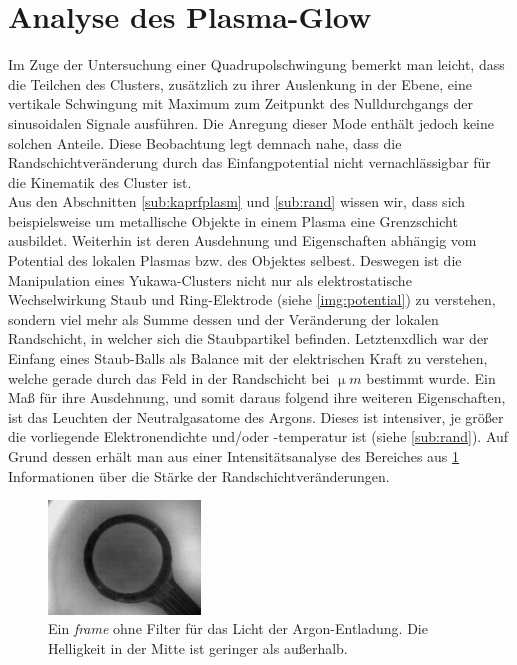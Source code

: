 \documentclass[numbers=noenddot,a4paper,notitlepage,twoside,BCOR15mm]{scrbook}
\newcommand{\tilt}[1]{\textit{#1}}
\begin{document}
		\section{Analyse des Plasma-Glow} \label{sub:glow}

		Im Zuge der Untersuchung einer Quadrupolschwingung bemerkt man leicht, dass die Teilchen des Clusters, zusätzlich zu ihrer Auslenkung in der Ebene, eine vertikale Schwingung mit Maximum zum Zeitpunkt des Nulldurchgangs der sinusoidalen Signale ausführen. Die Anregung dieser Mode enthält jedoch keine solchen Anteile. Diese Beobachtung legt demnach nahe, dass die Randschichtveränderung durch das Einfangpotential nicht vernachlässigbar für die Kinematik des Cluster ist.\\
		Aus den Abschnitten \ref{sub:kaprfplasm} und \ref{sub:rand} wissen wir,  dass sich beispielsweise um metallische Objekte in einem Plasma eine Grenzschicht ausbildet. Weiterhin ist deren Ausdehnung und Eigenschaften abhängig vom Potential des lokalen Plasmas bzw. des Objektes selbest. Deswegen ist die Manipulation eines Yukawa-Clusters nicht nur als elektrostatische Wechselwirkung Staub und Ring-Elektrode (siehe \ref{img:potential}) zu verstehen, sondern viel mehr als Summe dessen und der Veränderung der lokalen Randschicht, in welcher sich die Staubpartikel befinden. Letztenxdlich war der Einfang eines Staub-Balls als Balance mit der elektrischen Kraft zu verstehen, welche gerade durch das Feld in der Randschicht bei $\unit{\upmu m}$ bestimmt wurde. Ein Maß für ihre Ausdehnung, und somit daraus folgend ihre weiteren Eigenschaften, ist das Leuchten der Neutralgasatome des Argons. Dieses ist intensiver, je größer die vorliegende Elektronendichte und/oder -temperatur ist (siehe \ref{sub:rand}).  Auf Grund dessen erhält man aus einer Intensitätsanalyse des Bereiches aus \ref{img:glow} Informationen über die Stärke der Randschichtveränderungen.

			\begin{figure}
				\centering
				\includegraphics[width=0.36\textwidth,height=0.32\textwidth]{figs/ringplasmglowoben.png}
				\caption{Ein \tilt{frame} ohne Filter für das Licht der Argon-Entladung. Die Helligkeit in der Mitte ist geringer als außerhalb.}
				\label{img:glow}
				\vspace{-0.5cm}
			\end{figure}
\end{document}
